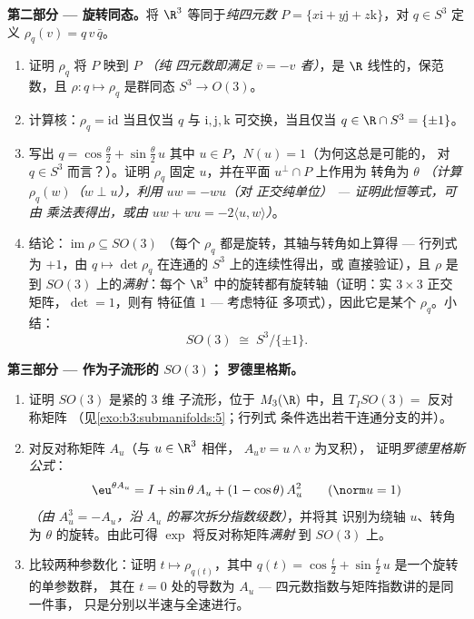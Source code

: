 \begin{problem}
\medskip
\noindent\textbf{第二部分 --- 旋转同态。}将
$\R^3$ 等同于\emph{纯四元数} $P = \{x\mathrm i +
y\mathrm j + z\mathrm k\}$，对 $q \in S^3$ 定义
$\rho_q(v) = q\,v\,\bar q$。
\begin{enumerate}[resume]
  \item 证明 $\rho_q$ 将 $P$ 映到 $P$ \emph{（纯
        四元数即满足 $\bar v = -v$ 者）}，是
        $\R$ 线性的，保范数，且 $\rho
        \colon q \mapsto \rho_q$ 是群同态 $S^3
        \to O(3)$。
  \item 计算核：$\rho_q = \mathrm{id}$ 当且仅当 $q$
        与 $\mathrm i, \mathrm j, \mathrm k$ 可交换，当且仅当
        $q \in \R\cap S^3 = \{\pm1\}$。
  \item 写出 $q = \cos\frac\theta2 + \sin\frac\theta2\,u$
        其中 $u \in P$，$N(u) = 1$（为何这总是可能的，
        对 $q \in S^3$ 而言？）。证明 $\rho_q$ 固定
        $u$，并在平面 $u^\perp\cap P$ 上作用为
        转角为 $\theta$ \emph{（计算
        $\rho_q(w)$（$w \perp u$），利用 $uw = -wu$（对
        正交纯单位） --- 证明此恒等式，可由
        乘法表得出，或由 $uw + wu =
        -2\langle u, w\rangle$）}。
  \item 结论：$\operatorname{im}\rho \subseteq SO(3)$
        （每个 $\rho_q$ 都是旋转，其轴与转角如上算得 ---
        行列式为 $+1$，由 $q
        \mapsto \det\rho_q$ 在连通的 $S^3$ 上的连续性得出，或
        直接验证），且 $\rho$ 是到 $SO(3)$ 上的\emph{满射}：每个
        $\R^3$ 中的旋转都有旋转轴（证明：实
        $3\times3$ 正交矩阵，$\det = 1$，则有
        特征值 $1$ --- 考虑特征
        多项式），因此它是某个 $\rho_q$。小结：
        \[
        SO(3) \;\cong\; S^3/\{\pm 1\} .
        \]
\end{enumerate}

\medskip
\noindent\textbf{第三部分 --- 作为子流形的 $SO(3)$；
罗德里格斯。}
\begin{enumerate}[resume]
  \item 证明 $SO(3)$ 是紧的 $3$ 维
        子流形，位于 $M_3(\R)$ 中，且 $T_ISO(3) =$
        反对称矩阵
        （见\cref{exo:b3:submanifolds:5}；行列式
        条件选出若干连通分支的并）。
  \item 对反对称矩阵 $A_u$（与 $u \in \R^3$ 相伴，
        $A_uv = u\wedge v$ 为叉积），
        证明\emph{罗德里格斯公式}：
        \[
        \eu^{\theta A_u} = I + \sin\theta\,A_u + (1 -
        \cos\theta)\,A_u^2 \qquad (\norm u = 1)
        \]
        \emph{（由 $A_u^3 = -A_u$，沿
        $A_u$ 的幂次拆分指数级数）}，并将其
        识别为绕轴 $u$、转角为 $\theta$ 的旋转。由此可得
        $\exp$ 将反对称矩阵\emph{满射}
        到 $SO(3)$ 上。
  \item 比较两种参数化：证明 $t
        \mapsto \rho_{q(t)}$，其中 $q(t) = \cos\frac t2 +
        \sin\frac t2\,u$ 是一个旋转的单参数群，
        其在 $t = 0$ 处的导数为 $A_u$
        --- 四元数指数与矩阵指数讲的是同一件事，
        只是分别以半速与全速进行。
\end{enumerate}


\end{problem}
